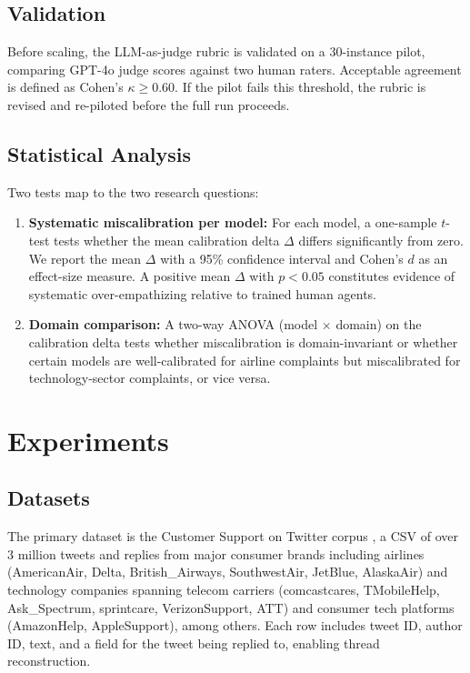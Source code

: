 \documentclass[11pt]{article}
\begin{document}
\subsection{Validation}

Before scaling, the LLM-as-judge rubric is validated on a 30-instance pilot, comparing GPT-4o judge scores against two human raters. Acceptable agreement is defined as Cohen's $\kappa \geq 0.60$. If the pilot fails this threshold, the rubric is revised and re-piloted before the full run proceeds.

\subsection{Statistical Analysis}

Two tests map to the two research questions:

\begin{enumerate}
	\item \textbf{Systematic miscalibration per model:} For each model, a one-sample $t$-test tests whether the mean calibration delta $\Delta$ differs significantly from zero. We report the mean $\Delta$ with a 95\% confidence interval and Cohen's $d$ as an effect-size measure. A positive mean $\Delta$ with $p < 0.05$ constitutes evidence of systematic over-empathizing relative to trained human agents.
	\item \textbf{Domain comparison:} A two-way ANOVA (model $\times$ domain) on the calibration delta tests whether miscalibration is domain-invariant or whether certain models are well-calibrated for airline complaints but miscalibrated for technology-sector complaints, or vice versa.\end{enumerate}



\section{Experiments}
\subsection{Datasets}
The primary dataset is the Customer Support on Twitter corpus \citep{stuart_axelbrooke_2017}, a CSV of over 3 million tweets and replies from major consumer brands including airlines (AmericanAir, Delta, British\_Airways, SouthwestAir, JetBlue, AlaskaAir) and technology companies spanning telecom carriers (comcastcares, TMobileHelp, Ask\_Spectrum, sprintcare, VerizonSupport, ATT) and consumer tech platforms (AmazonHelp, AppleSupport), among others. Each row includes tweet ID, author ID, text, and a field for the tweet being replied to, enabling thread reconstruction.
\end{document}
